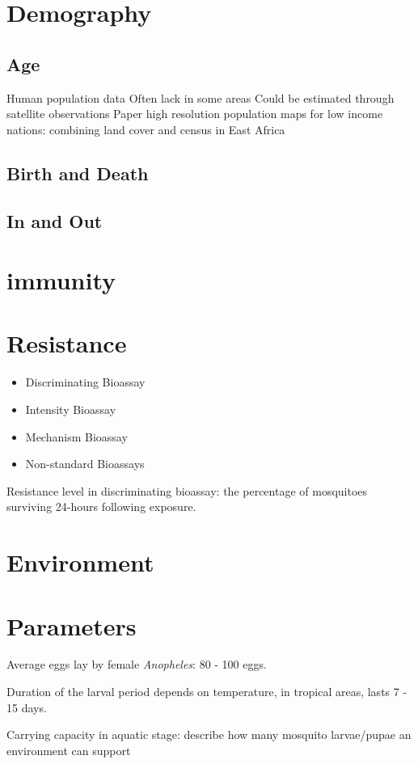 \documentclass[a4paper, 12pt, twoside]{article}
\begin{document}
\section{Demography}
\subsection{Age}
Human population data
Often lack in some areas
Could be estimated through satellite observations
Paper high resolution population maps for low income nations: combining land cover and census in East Africa

\subsection{Birth and Death}

\subsection{In and Out}

\section{immunity}

\section{Resistance}
\begin{itemize}
  \item Discriminating Bioassay
  \item Intensity Bioassay
  \item Mechanism Bioassay
  \item Non-standard Bioassays
\end{itemize}

Resistance level in discriminating bioassay: the percentage of mosquitoes surviving 24-hours following exposure.


\section{Environment}
\section{Parameters}

Average eggs lay by female \textit{Anopheles}: 80 - 100 eggs.

Duration of the larval period depends on temperature, in tropical areas, lasts 7 - 15 days.\cite{bayoh_lindsay_2003}

Carrying capacity in aquatic stage: describe how many mosquito larvae/pupae an environment can support

\appendix
\printglossaries
\printnomenclature


\end{document}
